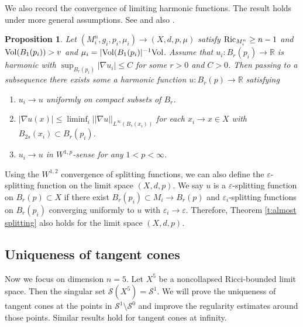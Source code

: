 \documentclass[11pt,reqno]{amsart}
\numberwithin{equation}{section}
\newcommand{\RR}{\mathds{R}}
\newcommand{\Ric}{{\rm Ric}}
\newcommand{\Vol}{{\rm Vol}}
\newcommand{\cS}{\mathcal{S}}
\newtheorem{proposition}[thm]{Proposition}
\theoremstyle{definition}
\theoremstyle{remark}
\begin{document}
We also record the convergence of limiting harmonic functions. The result holds under more general assumptions. See \cite{cjn,jn} and also \cite{ah18,aht18,che99,din02,gms15,mn19,zz19}. 


\begin{proposition}\label{p:convergence splitting function}
    Let $(M^n_i,g_i,p_i,\mu_i) \to (X,d,p,\mu)$ satisfy $\Ric_{M^n_i} \ge n-1$ and $\Vol(B_1(p_i)) > v$ and $\mu_i = |\Vol(B_1(p_i)|^{-1}\Vol$. Assume that $u_i: B_r(p_i) \to \RR$ is harmonic with $\sup_{B_r(p_i)}|\nabla u_i| \leqslant C$ for some $r>0$ and $C>0$. Then passing to a subsequence there exists some a harmonic function $u: B_r(p) \to \RR$ satisfying 
    \begin{enumerate}
        \item $u_i \to u$ uniformly on compact subsets of $B_r$. 
        \item $|\nabla u(x)| \leqslant \liminf_i ||\nabla u||_{L^{\infty}(B_s(x_i))}$ for each $x_i \to x \in X$ with $B_{2s}(x_i) \subset B_r(p_i)$. 
        \item $u_i \to u$ in $W^{1,p}$-sense for any $1<p<\infty$.
    \end{enumerate}
\end{proposition}


Using the $W^{1,2}$ convergence of splitting functions, we can also define the $\varepsilon$-splitting function on the limit space $(X,d,p)$. We say $u$ is a $\varepsilon$-splitting function on $B_r(p) \subset X$ if there exist $B_r(p_i) \subset M_i \to B_r(p)$ and $\varepsilon_i$-splitting functions on $B_r(p_i)$ converging uniformly to $u$ with $\varepsilon_i \to \varepsilon$. Therefore, Theorem \ref{t:almost splitting} also holds for the limit space $(X,d,p)$. 

















\subsection{Uniqueness of tangent cones}\label{subs:uniqueness}

Now we focus on dimension $n=5$. Let $X^5$ be a noncollapsed Ricci-bounded limit space. Then the singular set $\cS(X^5) = \cS^1$. We will prove the uniqueness of tangent cones at the points in $\cS^1 \setminus \cS^0$ and improve the regularity estimates around those points. Similar results hold for tangent cones at infinity. 
\end{document}
